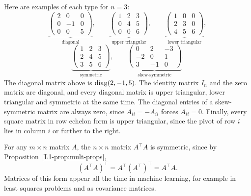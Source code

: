 \begin{example}
    Here are examples of each type for $n = 3$:
    \[\underbrace{\begin{pmatrix}
        2 & 0 & 0 \\
        0 & -1 & 0 \\
        0 & 0 & 5
    \end{pmatrix}}_{\text{diagonal}}, \qquad \underbrace{\begin{pmatrix}
        1 & 2 & 3 \\
        0 & 4 & 5 \\
        0 & 0 & 6
    \end{pmatrix}}_{\text{upper triangular}}, \qquad \underbrace{\begin{pmatrix}
        1 & 0 & 0 \\
        2 & 3 & 0 \\
        4 & 5 & 6
    \end{pmatrix}}_{\text{lower triangular}},\]
    \[\underbrace{\begin{pmatrix}
        1 & 2 & 3 \\
        2 & 4 & 5 \\
        3 & 5 & 6
    \end{pmatrix}}_{\text{symmetric}}, \qquad \underbrace{\begin{pmatrix}
        0 & 2 & -3 \\
        -2 & 0 & 1 \\
        3 & -1 & 0
    \end{pmatrix}}_{\text{skew-symmetric}}.\]
    The diagonal matrix above is $\operatorname{diag}(2, -1, 5)$. The identity matrix $I_n$ and the zero matrix are diagonal, and every diagonal matrix is upper triangular, lower triangular and symmetric at the same time. The diagonal entries of a skew-symmetric matrix are always zero, since $A_{ii} = -A_{ii}$ forces $A_{ii} = 0$. Finally, every square matrix in row echelon form is upper triangular, since the pivot of row $i$ lies in column $i$ or further to the right.
\end{example}

\begin{example}
    For any $m \times n$ matrix $A$, the $n \times n$ matrix $A^\top A$ is symmetric, since by Proposition~\ref{L1-prop:mult-props},
    \[(A^\top A)^\top = A^\top (A^\top)^\top = A^\top A.\]
    Matrices of this form appear all the time in machine learning, for example in least squares problems and as covariance matrices.
\end{example}

